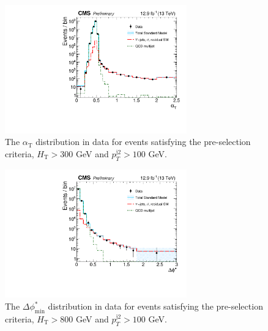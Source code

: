 \maketitle



\clearpage
\begin{figure}[tbhp]
    \caption{ 
    The $\alpha_{\mathrm{T}}$ distribution in data for events satisfying the pre-selection criteria, $H_{\mathrm{T}} > 300$ GeV and $p_{T}^{\mathrm{j2}} > 100$ GeV. 
    \label{fig:alphaT} }
  \begin{center}
  \includegraphics[width=0.7\textwidth]{figures/alphaT_160808}
  \end{center}
\end{figure}


\begin{figure}[tbhp]
    \caption{ 
    The $\Delta\phi^{*}_{\mathrm{min}}$ distribution in data for events satisfying the pre-selection criteria, $H_{\mathrm{T}} > 800$ GeV and $p_{T}^{\mathrm{j2}} > 100$ GeV. 
    \label{fig:bDPhi} }
  \begin{center}
  \includegraphics[width=0.7\textwidth]{figures/bDPhi_160808}
  \end{center}
\end{figure}


